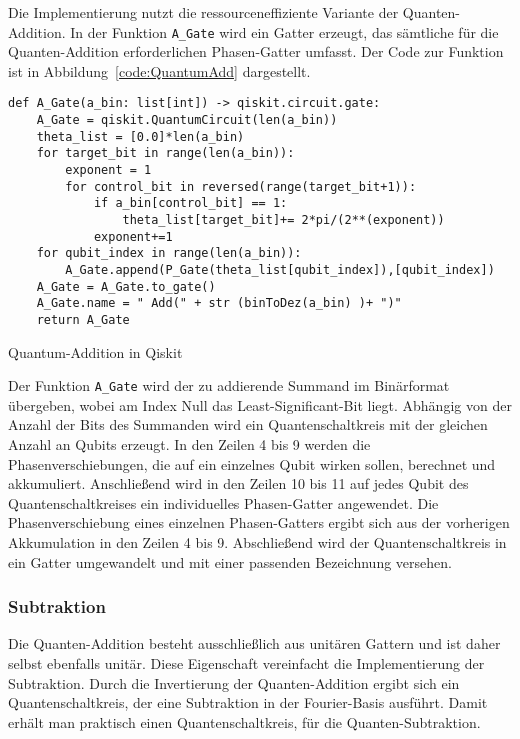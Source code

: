 Die Implementierung nutzt die ressourceneffiziente Variante der Quanten-Addition.
In der Funktion \texttt{A\_Gate} wird ein Gatter erzeugt, 
das sämtliche für die Quanten-Addition erforderlichen Phasen-Gatter umfasst.
Der Code zur Funktion ist in Abbildung~\ref{code:QuantumAdd} dargestellt.
\begin{listing}[H]
\begin{verbatim}    
def A_Gate(a_bin: list[int]) -> qiskit.circuit.gate:
    A_Gate = qiskit.QuantumCircuit(len(a_bin))
    theta_list = [0.0]*len(a_bin)
    for target_bit in range(len(a_bin)):
        exponent = 1
        for control_bit in reversed(range(target_bit+1)):
            if a_bin[control_bit] == 1:
                theta_list[target_bit]+= 2*pi/(2**(exponent))
            exponent+=1
    for qubit_index in range(len(a_bin)):
        A_Gate.append(P_Gate(theta_list[qubit_index]),[qubit_index])
    A_Gate = A_Gate.to_gate()
    A_Gate.name = " Add(" + str (binToDez(a_bin) )+ ")"
    return A_Gate 
  \end{verbatim}
  \caption{Quantum-Addition in Qiskit}
  \label{code:QuantumAdd}
\end{listing}
Der Funktion \texttt{A\_Gate} wird der zu addierende Summand im Binärformat übergeben, 
wobei am Index Null das Least-Significant-Bit liegt.
Abhängig von der Anzahl der Bits des Summanden wird ein Quantenschaltkreis mit der gleichen Anzahl an Qubits erzeugt. 
In den Zeilen 4 bis 9 werden die Phasenverschiebungen, die auf ein einzelnes Qubit wirken sollen, berechnet und akkumuliert.
Anschließend wird in den Zeilen 10 bis 11 auf jedes Qubit des Quantenschaltkreises ein individuelles Phasen-Gatter angewendet.
Die Phasenverschiebung eines einzelnen Phasen-Gatters ergibt sich aus der vorherigen Akkumulation in den Zeilen 4 bis 9.
Abschließend wird der Quantenschaltkreis in ein Gatter umgewandelt und mit einer passenden Bezeichnung versehen.

\subsubsection{Subtraktion}
Die Quanten-Addition besteht ausschließlich aus unitären Gattern und ist daher selbst ebenfalls unitär.
Diese Eigenschaft vereinfacht die Implementierung der Subtraktion. 
Durch die Invertierung der Quanten-Addition ergibt sich ein Quantenschaltkreis, 
der eine Subtraktion in der Fourier-Basis ausführt. 
Damit erhält man praktisch einen Quantenschaltkreis, für die Quanten-Subtraktion.

